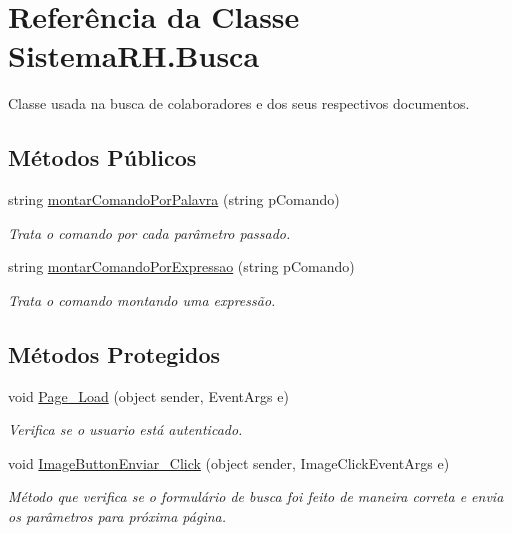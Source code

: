 \hypertarget{class_sistema_r_h_1_1_busca}{
\section{Referência da Classe SistemaRH.Busca}
\label{class_sistema_r_h_1_1_busca}
}


Classe usada na busca de colaboradores e dos seus respectivos documentos.  


\subsection*{Métodos Públicos}
\begin{DoxyCompactItemize}
\item 
string \hyperlink{class_sistema_r_h_1_1_busca_acc50318b66f3f708eb72073237a82ebe}{montarComandoPorPalavra} (string pComando)
\begin{DoxyCompactList}\small\item\em Trata o comando por cada parâmetro passado. \item\end{DoxyCompactList}\item 
string \hyperlink{class_sistema_r_h_1_1_busca_a44d1bb062c7a7b778b35433399ee0e68}{montarComandoPorExpressao} (string pComando)
\begin{DoxyCompactList}\small\item\em Trata o comando montando uma expressão. \item\end{DoxyCompactList}\end{DoxyCompactItemize}
\subsection*{Métodos Protegidos}
\begin{DoxyCompactItemize}
\item 
void \hyperlink{class_sistema_r_h_1_1_busca_a5d158cafd0ed83f8ede39d606f6bffc8}{Page\_\-Load} (object sender, EventArgs e)
\begin{DoxyCompactList}\small\item\em Verifica se o usuario está autenticado. \item\end{DoxyCompactList}\item 
void \hyperlink{class_sistema_r_h_1_1_busca_a495153d2c08337272920fb776d2e897c}{ImageButtonEnviar\_\-Click} (object sender, ImageClickEventArgs e)
\begin{DoxyCompactList}\small\item\em Método que verifica se o formulário de busca foi feito de maneira correta e envia os parâmetros para próxima página. \item\end{DoxyCompactList}\end{DoxyCompactItemize}
